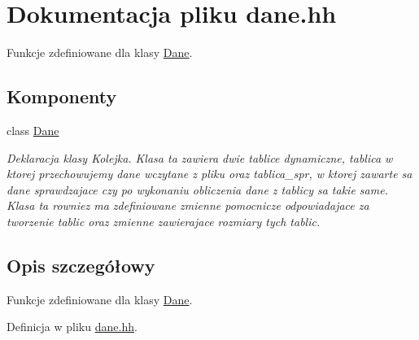 \hypertarget{dane_8hh}{\section{\-Dokumentacja pliku dane.\-hh}
\label{dane_8hh}
}


\-Funkcje zdefiniowane dla klasy \hyperlink{class_dane}{\-Dane}.  


\subsection*{\-Komponenty}
\begin{DoxyCompactItemize}
\item 
class \hyperlink{class_dane}{\-Dane}
\begin{DoxyCompactList}\small\item\em \-Deklaracja klasy \-Kolejka. \-Klasa ta zawiera dwie tablice dynamiczne, tablica w ktorej przechowujemy dane wczytane z pliku oraz tablica\-\_\-spr, w ktorej zawarte sa dane sprawdzajace czy po wykonaniu obliczenia dane z tablicy sa takie same. \-Klasa ta rowniez ma zdefiniowane zmienne pomocnicze odpowiadajace za tworzenie tablic oraz zmienne zawierajace rozmiary tych tablic. \end{DoxyCompactList}\end{DoxyCompactItemize}


\subsection{\-Opis szczegółowy}
\-Funkcje zdefiniowane dla klasy \hyperlink{class_dane}{\-Dane}. 

\-Definicja w pliku \hyperlink{dane_8hh_source}{dane.\-hh}.

